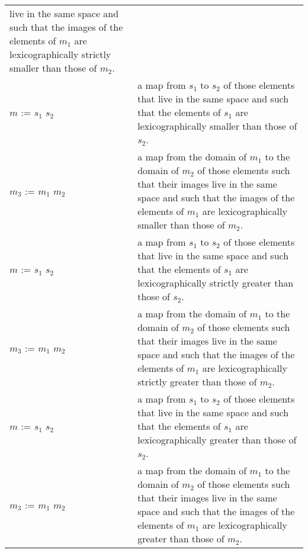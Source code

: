 \begin{supertabular}{p{0.35\textwidth}p{0.6\textwidth}}
live in the same space and such that the images of the elements of
$m_1$ are lexicographically strictly smaller than those of $m_2$.
\\
$m$ := $s_1$ \ai[\tt]{<<=} $s_2$ & a map from
$s_1$ to $s_2$ of those elements that live in the same space and
such that the elements of $s_1$ are lexicographically smaller
than those of $s_2$.
\\
$m_3$ := $m_1$ \ai[\tt]{<<=} $m_2$ & a map from the domain of
$m_1$ to the domain of $m_2$ of those elements such that their images
live in the same space and such that the images of the elements of
$m_1$ are lexicographically smaller than those of $m_2$.
\\
$m$ := $s_1$ \ai[\tt]{>>} $s_2$ & a map from
$s_1$ to $s_2$ of those elements that live in the same space and
such that the elements of $s_1$ are lexicographically strictly greater
than those of $s_2$.
\\
$m_3$ := $m_1$ \ai[\tt]{>>} $m_2$ & a map from the domain of
$m_1$ to the domain of $m_2$ of those elements such that their images
live in the same space and such that the images of the elements of
$m_1$ are lexicographically strictly greater than those of $m_2$.
\\
$m$ := $s_1$ \ai[\tt]{>>=} $s_2$ & a map from
$s_1$ to $s_2$ of those elements that live in the same space and
such that the elements of $s_1$ are lexicographically greater
than those of $s_2$.
\\
$m_3$ := $m_1$ \ai[\tt]{>>=} $m_2$ & a map from the domain of
$m_1$ to the domain of $m_2$ of those elements such that their images
live in the same space and such that the images of the elements of
$m_1$ are lexicographically greater than those of $m_2$.
\\
\end{supertabular}
